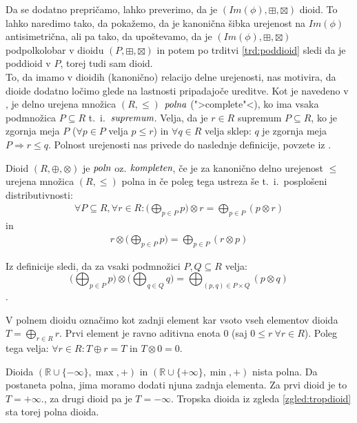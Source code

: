 \documentclass[mat1]{fmfdelo}
\newcommand{\R}{\mathbb{R}}
\newcommand{\pojem}[1]{\ensuremath{\emph{#1}}}
\begin{document}
Da se dodatno prepričamo, lahko preverimo, da je $(Im(\phi), \boxplus, \boxtimes)$ dioid. To lahko naredimo tako, da pokažemo, da je kanonična šibka urejenost na $Im(\phi)$ antisimetrična, ali pa tako, da upoštevamo, da je $(Im(\phi), \boxplus, \boxtimes)$ podpolkolobar v dioidu $(P, \boxplus, \boxtimes)$ in potem po trditvi \ref{trd:poddioid} sledi da je poddioid v $P$, torej tudi sam dioid.
\newline \\
To, da imamo v dioidih (kanonično) relacijo delne urejenosti, nas motivira, da dioide dodatno ločimo glede na lastnosti pripadajoče ureditve. Kot je navedeno v \cite[str. 10]{bib:Gondran}, je delno urejena množica $(R, \leq)$ \pojem{polna }(">complete"<), ko ima vsaka podmnožica $P \subseteq R$ t.~i.~\pojem{supremum}. 
Velja, da je $r\in R$ supremum $P\subseteq R$, ko je zgornja meja $P$ ($\forall p \in P$ velja $ p \leq r$) in $\forall q \in R$ velja sklep: $q$ je zgornja meja $P \Rightarrow r \leq q$. Polnost urejenosti nas privede do naslednje definicije, povzete iz \cite[definicija 6.\,1.\,8.\,]{bib:Gondran}.

\begin{definicija}
	Dioid $(R, \oplus,\otimes)$ je \pojem{poln} oz. \pojem{kompleten}, če je za kanonično delno urejenost $\leq$ urejena množica $(R, \leq)$ polna in če poleg tega ustreza še t.~i.~posplošeni distributivnosti: \begin{align*}
		\forall P \subseteq R, \forall r \in R: \big(\bigoplus_{p\in P}p\big) \otimes r = \bigoplus_{p\in P} \left(p \otimes r\right)
	\end{align*}
in
\begin{align*}
	r \otimes \big( \bigoplus_{p\in P} p \big) = \bigoplus_{p \in P} \left( r \otimes p \right)
\end{align*}
\end{definicija}

Iz definicije sledi, da za vsaki podmnožici $P, Q \subseteq R$ velja: $$\big( \bigoplus_{p\in P} p \big) \otimes \big( \bigoplus_{q\in Q} q \big) = \bigoplus_{(p, q) \in P\times Q} (p \otimes q)$$.

V polnem dioidu označimo kot zadnji element kar vsoto vseh elementov dioida $T = \bigoplus_{r \in R} r$. Prvi element je ravno aditivna enota $0$ (saj $0\leq r~\forall r\in R$). Poleg tega velja: $\forall r\in R: T \oplus r = T$ in $T \otimes 0 = 0$.

\begin{zgled}
	Dioida $(\R\cup \{-\infty\}, \max, +)$ in $(\R\cup \{+\infty\}, \min, +)$ nista polna. Da postaneta polna, jima moramo dodati njuna zadnja elementa. Za prvi dioid je to $T = +\infty$., za drugi dioid pa je $T = -\infty$. Tropska dioida iz zgleda \ref{zgled:tropdioid} sta torej polna dioida.
\end{zgled}
\end{document}
